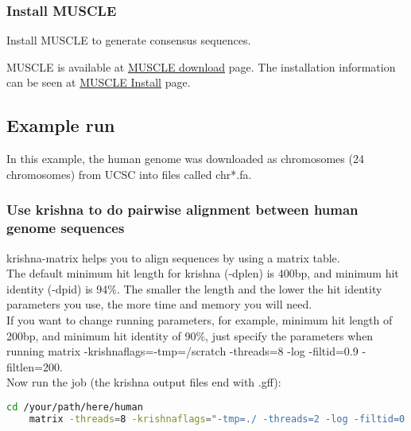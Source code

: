 \documentclass[a4paper,12pt]{article}
\begin{document}
	\subsubsection{ Install MUSCLE}
	Install MUSCLE to generate consensus sequences.
	
	\noindent MUSCLE is available at \href{https://www.drive5.com/muscle/downloads.htm} {\color{blue}MUSCLE download} page.
	\noindent The installation information can be seen at \href{https://www.drive5.com/muscle/manual/install.html} {\color{blue}MUSCLE Install} page.
	
	
	\subsection{Example run}
	In this example, the human genome was downloaded as chromosomes (24 chromosomes) from UCSC into files called chr*.fa.
	
	\subsubsection{Use krishna to do pairwise alignment between human genome sequences}
	
	krishna-matrix helps you to align sequences by using a matrix table. \\
	
	\noindent The default minimum hit length for krishna (-dplen) is 400bp, and minimum hit identity (-dpid) is 94\%. The smaller the length and the lower the hit identity parameters you use, the more time and memory you will need. \\
	
	\noindent If you want to change running parameters, for example, minimum hit length of 200bp, and minimum hit identity of 90\%, just specify the parameters when running matrix {\color{red}-krishnaflags=\textquotedbl-tmp=/scratch -threads=8 -log -filtid=0.9 -filtlen=200\textquotedbl}.\\
	
	\noindent Now run the job (the krishna output files end with .gff):
	
	\begin{lstlisting}[language=bash]
	cd /your/path/here/human 
	matrix -threads=8 -krishnaflags="-tmp=./ -threads=2 -log -filtid=0.94 -filtlen=400 -target=chr*.fa" chr*.fa \end{lstlisting}
	
\end{document}

